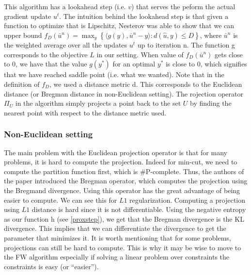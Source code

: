 This algorithm has a lookahead step (i.e. $v$) that serves the peform the actual
gradient update $u^t$. The intuition behind the lookahead step is that given a
function to optimize that is Lipschitz, Nesterov was able to show that we can
upper bound $f_{D}(\bar{u}^n) = \max_y \left \{ \langle g(y),\bar{u}^n - y
\rangle : d(\hat{u},y) \leq D \right \}$, where $\bar{u}^n$ is the weighted
average over all the updates $u^t$ up to iteration n. The function g corresponds
to the objective ${L}$ in our setting. When value of $f_D(\bar{u}^n)$ gets close
to 0, we have that the value $g(y^*)$ for an optimal $y^*$ is close to 0, which
signifies that we have reached saddle point (i.e. what we wanted). Note that in
the definition of $f_D$, we used a
distance metric d. This corresponds to the Euclidean distance (or Bregman
distance in non-Euclidean setting). The rojection operator $\Pi_{{U}}$ in the
algorithm simply projects a point back to the set ${U}$ by finding the nearest
point with respect to the distance metric used.

\clearpage
\subsubsection{Non-Euclidean setting}
The main problem with the Euclidean projection operator is that for many
problems, it is hard to compute the projection. Indeed for min-cut, we need to
compute the partition function first, which is \#P-complete. Thus, the authors
of the paper introduced the Bregman operator, which computes the projection
using the Bregmand divergence. Using this operator has the great advantage of
being easier to compute. We can see this for $L1$ regularization. Computing a
projection using $L1$ distance is hard since it is not differentiable. Using the
negative entropy as our function h (see \ref{proxstep}), we get that the Bregman
divergence is the KL divergence. This implies that we can differentiate the
divergence to get the parameter that minimizes it. It is worth mentioning that
for some problems, projections can still be hard to compute. This is why it may
be wise to move to the FW algorithm especially if solving a linear problem over
constraints the constraints is easy (or ``easier'').

